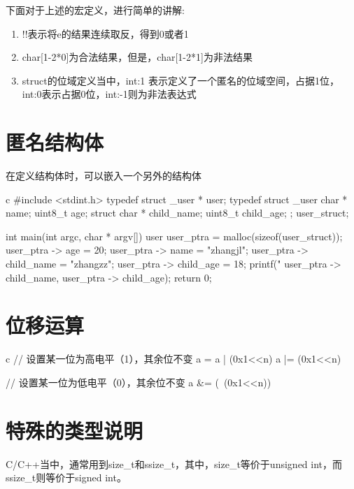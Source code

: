 \begin{outline}[enumerate]
下面对于上述的宏定义，进行简单的讲解:
\begin{enumerate}
  \item !!表示将e的结果连续取反，得到0或者1
  \item char[1-2*0]为合法结果，但是，char[1-2*1]为非法结果
  \item struct的位域定义当中，int:1 表示定义了一个匿名的位域空间，占据1位，int:0表示占据0位，int:-1则为非法表达式
\end{enumerate}

\end{outline}

\section{匿名结构体}
在定义结构体时，可以嵌入一个另外的结构体
\begin{code-block}{c}
#include <stdint.h>
typedef struct _user * user;
typedef struct _user {
    char * name;
    uint8_t age;
    struct {
        char * child_name;
        uint8_t child_age;
    };
}user_struct;

int main(int argc, char * argv[])
{
    user user_ptra = malloc(sizeof(user_struct));
    user_ptra -> age = 20;
    user_ptra -> name = "zhangjl";
    user_ptra -> child_name = "zhangzz";
    user_ptra -> child_age = 18;
    printf("%
           user_ptra -> child_name, user_ptra -> child_age);
    return 0;
}
\end{code-block}

\section{位移运算}
\begin{code-block}{c}
// 设置某一位为高电平（1），其余位不变
a = a | (0x1<<n)
a |= (0x1<<n)

// 设置某一位为低电平（0），其余位不变
a &= (~(0x1<<n))
\end{code-block}

\section{特殊的类型说明}

C/C++当中，通常用到size\_t和ssize\_t，其中，size\_t等价于unsigned int，而
ssize\_t则等价于signed int。

